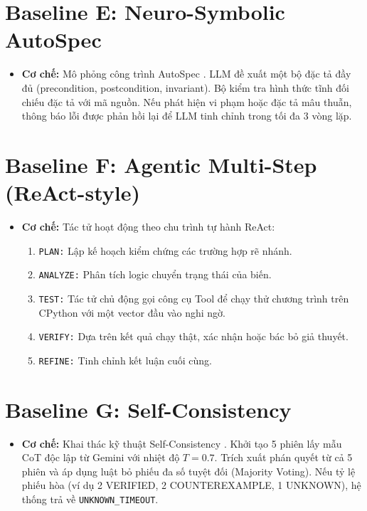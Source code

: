 \section{Baseline E: Neuro-Symbolic AutoSpec}
\begin{itemize}
    \item \textbf{Cơ chế:} Mô phỏng công trình AutoSpec \cite{wen2024autospec}. LLM đề xuất một bộ đặc tả đầy đủ (precondition, postcondition, invariant). Bộ kiểm tra hình thức tĩnh đối chiếu đặc tả với mã nguồn. Nếu phát hiện vi phạm hoặc đặc tả mâu thuẫn, thông báo lỗi được phản hồi lại để LLM tinh chỉnh trong tối đa 3 vòng lặp.
\end{itemize}

\section{Baseline F: Agentic Multi-Step (ReAct-style)}
\begin{itemize}
    \item \textbf{Cơ chế:} Tác tử hoạt động theo chu trình tự hành ReAct:
    \begin{enumerate}
        \item \texttt{PLAN:} Lập kế hoạch kiểm chứng các trường hợp rẽ nhánh.
        \item \texttt{ANALYZE:} Phân tích logic chuyển trạng thái của biến.
        \item \texttt{TEST:} Tác tử chủ động gọi công cụ Tool để chạy thử chương trình trên CPython với một vector đầu vào nghi ngờ.
        \item \texttt{VERIFY:} Dựa trên kết quả chạy thật, xác nhận hoặc bác bỏ giả thuyết.
        \item \texttt{REFINE:} Tinh chỉnh kết luận cuối cùng.
    \end{enumerate}
\end{itemize}

\section{Baseline G: Self-Consistency}
\begin{itemize}
    \item \textbf{Cơ chế:} Khai thác kỹ thuật Self-Consistency \cite{wang2022self}. Khởi tạo 5 phiên lấy mẫu CoT độc lập từ Gemini với nhiệt độ $T = 0.7$. Trích xuất phán quyết từ cả 5 phiên và áp dụng luật bỏ phiếu đa số tuyệt đối (Majority Voting). Nếu tỷ lệ phiếu hòa (ví dụ 2 VERIFIED, 2 COUNTEREXAMPLE, 1 UNKNOWN), hệ thống trả về \texttt{UNKNOWN\_TIMEOUT}.
\end{itemize}

